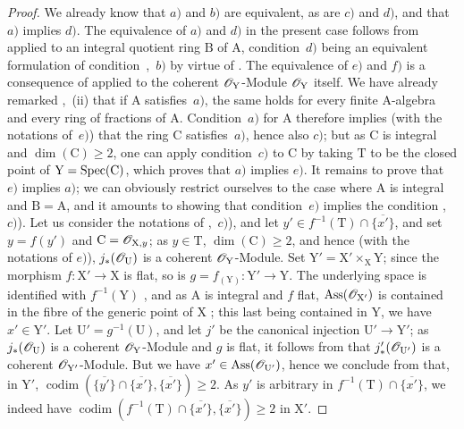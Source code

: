 \begin{proof}
We already know  that $a)$ and $b)$ are equivalent, as are $c)$ and $d)$, and that $a)$ implies $d)$.
The equivalence of $a)$ and $d)$ in the present case follows from  applied to an integral quotient ring $\mathrm{B}$ of $\mathrm{A}$, condition~$d)$ being an equivalent formulation of condition~,~$b)$ by virtue of .
The equivalence of $e)$ and $f)$ is a consequence of  applied to the coherent $\mathscr{O}_\mathrm{Y}$-Module $\mathscr{O}_\mathrm{Y}$ itself.
We have already remarked ,~(ii) that if $\mathrm{A}$ satisfies~$a)$, the same holds for every finite A-algebra and every ring of fractions of $\mathrm{A}$.
Condition~$a)$ for $\mathrm{A}$ therefore implies (with the notations of~$e)$) that the ring $\mathrm{C}$ satisfies~$a)$, hence also $c)$; but as $\mathrm{C}$ is integral and $\dim(\mathrm{C})\geqslant 2$, one can apply condition~$c)$ to $\mathrm{C}$ by taking $\mathrm{T}$ to be the closed point of $\mathrm{Y}=\operatorname{Spec}(\mathrm{C})$, which proves that $a)$ implies $e)$.
It remains to prove that $e)$ implies $a)$;
we can obviously restrict ourselves to the case where $\mathrm{A}$ is integral and $\mathrm{B}=\mathrm{A}$, and it amounts to showing that condition~$e)$ implies the condition ,~$c)$).
Let us consider the notations of ,~$c)$), and let $y'\in f^{-1}(\mathrm{T})\cap\overline{\{x'\}}$, and set $y=f(y')$ and $\mathrm{C}=\mathscr{O}_{\mathrm{X},y}$; as $y\in\mathrm{T}$, $\dim(\mathrm{C})\geqslant 2$, and hence (with the notations of $e)$), $j_*(\mathscr{O}_\mathrm{U})$ is a coherent $\mathscr{O}_\mathrm{Y}$-Module.
Set $\mathrm{Y}'=\mathrm{X}'\times_\mathrm{X}\mathrm{Y}$; since the morphism $f:\mathrm{X}'\to\mathrm{X}$ is flat, so is $g=f_{(\mathrm{Y})}:\mathrm{Y}'\to\mathrm{Y}$.
The underlying space is identified with $f^{-1}(\mathrm{Y})$ , and as $\mathrm{A}$ is integral and $f$ flat, $\operatorname{Ass}(\mathscr{O}_{\mathrm{X}'})$ is contained in the fibre of the generic point of $\mathrm{X}$ ; this last being contained in $\mathrm{Y}$, we have $x'\in\mathrm{Y}'$.
Let $\mathrm{U}'=g^{-1}(\mathrm{U})$, and let $j'$ be the canonical injection $\mathrm{U}'\to\mathrm{Y}'$; as $j_*(\mathscr{O}_\mathrm{U})$ is a coherent $\mathscr{O}_\mathrm{Y}$-Module and $g$ is flat, it follows from  that $j'_*(\mathscr{O}_{\mathrm{U}'})$ is a coherent $\mathscr{O}_{\mathrm{Y}'}$-Module.
But we have $x'\in\operatorname{Ass}(\mathscr{O}_{\mathrm{U}'})$, hence we conclude from  that, in $\mathrm{Y}'$,
$\operatorname{codim}(\overline{\{y'\}}\cap\overline{\{x'\}},\overline{\{x'\}})\geqslant 2$.
As $y'$ is arbitrary in $f^{-1}(\mathrm{T})\cap\overline{\{x'\}}$, we indeed have
$\operatorname{codim}(f^{-1}(\mathrm{T})\cap\overline{\{x'\}},\overline{\{x'\}})\geqslant 2$ in $\mathrm{X}'$.
\end{proof}

